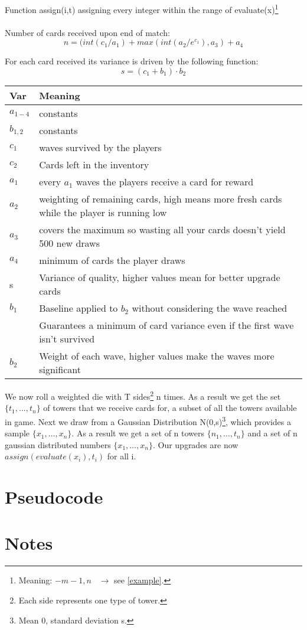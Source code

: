 \documentclass{scrartcl}
\begin{document}
Function assign(i,t) assigning every integer within the range of evaluate(x)\footnote{Meaning: $-m-1, n \;\;\; \rightarrow$ see \ref{example}.}\\ \\ 

Number of cards received upon end of match: 
$$ n = (int(c_1/a_1)+max(int(a_2/e^{c_1}),a_3)+a_4$$

For each card received its variance is driven by the following function:
$$s = (c_1 + b_1)\cdot b_2$$


\begin{tabular}{l|l}
Var & Meaning\\
\hline
$a_{1-4}$ & constants\\
$b_{1,2}$ & constants\\
$c_1$ & waves survived by the players\\
$c_2$ & Cards left in the inventory\\
$a_1$ & every $a_1$ waves the players receive a card for reward\\
$a_2$ & weighting of remaining cards, high means more fresh cards while the player is running low\\
$a_3$ & covers the maximum so wasting all your cards doesn't yield 500 new draws\\
$a_4$ & minimum of cards the player draws\\
\hline
s	& Variance of quality, higher values mean for better upgrade cards\\
$b_1$ & Baseline applied to $b_2$ without considering the wave reached\\
& Guarantees a minimum of card variance even if the first wave isn't survived\\
$b_2$ & Weight of each wave, higher values make the waves more significant\\
\end{tabular}

We now roll a weighted die with T sides\footnote{Each side represents one type of tower.} n times. As a result we get the set $\{t_1,\ldots , t_n\}$ of towers that we receive cards for, a subset of all the towers available in game. Next we draw from a Gaussian Distribution N(0,s)\footnote{Mean 0, standard deviation s.}, which provides a sample $\{x_1,\ldots , x_n\}.$ As a result we get a set of n towers $\{n_1,\ldots ,t_n\}$ and a set of n gaussian distributed numbers $\{x_1, \ldots , x_n\}$. Our upgrades are now $assign(evaluate(x_i),t_i)$ for all i.

\section{Pseudocode}



\section{Notes}
\end{document}
